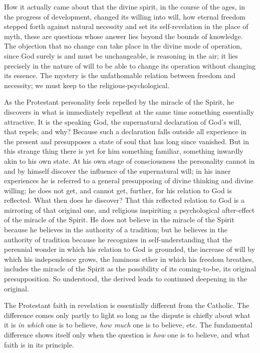 \documentclass[12pt,a4paper,openany]{book}
\newcommand{\opage}[1]{\marginnote{\footnotesize\textit{[#1]}}}
\begin{document}
\setcounter{footnote}{0}%
\opage{71}How it actually came about that the divine
spirit, in the course of the ages, in the progress of development,
changed its willing into will, how
eternal freedom stepped forth against natural necessity and %
set its self-revelation in the place of myth, these are
questions whose answer lies beyond the bounds of
knowledge. The objection that no change can
take place in the divine mode of operation, since
God surely is and must be unchangeable, is reasoning
in the air; it lies precisely in the nature of will
to be able to change its operation without changing its essence.
The mystery is the unfathomable relation between freedom
and necessity; we must keep to the religious-psychological.


As the Protestant personality feels repelled
by the miracle of the Spirit, he discovers in what is immediately
repellent at the same time something essentially attractive. It
is the speaking God, the supernatural declaration of God's will,
that repels; and why? Because such a
declaration falls outside all experience in
the present and presupposes a state of soul that has long
since vanished. But in this strange thing there is yet for him
something familiar, something inwardly akin to his own state.
At his own stage of consciousness the personality
cannot in and by himself discover the influence of the supernatural
will; in his inner experiences he is referred
to a general presupposing of divine
thinking and divine willing; he does not get, and
cannot get, further, for his relation to God is reflected.
What then does he discover? That this reflected
relation to God is a mirroring of that original one, and
religious inspiriting a psychological after-effect
\setcounter{footnote}{0}%
\opage{72}of the miracle of the Spirit. He does not believe in the miracle of the Spirit
because he believes in the authority of a tradition; but
he believes in the authority of tradition because he
recognizes in self-understanding that the perennial wonder
in which his relation to God is grounded, the increase of will
by which his independence grows, the luminous ether
in which his freedom breathes, includes the miracle of the Spirit
as the possibility of its coming-to-be, its original presupposition.
So understood, the derived leads to continued
deepening in the original.

The Protestant faith in revelation is essentially
different from the Catholic. The difference comes
only partly to light so long as the dispute is chiefly
about what it is \emph{in which} one is to believe, \emph{how much} one is to believe, etc. The fundamental difference
shows itself only when the question is \emph{how} one
is to believe, and what faith is in its principle.
\end{document}
